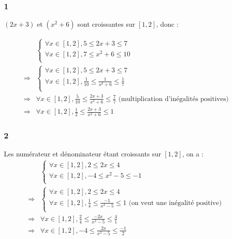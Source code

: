 \documentclass{report}
\begin{document}
\subsubsection*{1}

$(2x+3)$ et $(x^2+6)$ sont croissantes sur $[1, 2]$, donc :

\begin{equation*}
	\begin{split}
	&\begin{cases}
		\forall x \in [1, 2], 5 \le 2x+3 \le 7 \\
		\forall x \in [1, 2], 7 \le x^2+6 \le 10 \\
	\end{cases} \\
	\Rightarrow
	&\begin{cases}
		\forall x \in [1, 2], 5 \le 2x+3 \le 7 \\
		\forall x \in [1, 2], \frac{1}{10} \le \frac{1}{x^2+6} \le \frac{1}{7} \\
	\end{cases}\\
	\Rightarrow
	& \forall x \in [1, 2], \frac{5}{10} \le \frac{2x+3}{x^2+6} \le \frac{7}{7}  \text{ (multiplication d'inégalités positives)}\\
	\Rightarrow
	&\forall x \in [1, 2], \frac{1}{2} \le \frac{2x+3}{x^2+6} \le 1
	\end{split}
\end{equation*}

\subsubsection*{2}

Les numérateur et dénominateur étant croissants sur $[1,2]$, on a :
\begin{equation*}
	\begin{split}
		&\begin{cases}
			\forall x \in [1, 2], 2 \le 2x \le 4 \\
			\forall x \in [1, 2], -4 \le x^2-5 \le -1 \\
		\end{cases} \\
		\Rightarrow
		&\begin{cases}
			\forall x \in [1, 2], 2 \le 2x \le 4 \\
			\forall x \in [1, 2], \frac{1}{4} \le \frac{-1}{x^2-5} \le 1  \text{ (on veut une inégalité positive)}\\
		\end{cases} \\
		\Rightarrow
		& \forall x \in [1, 2], \frac{2}{4} \le \frac{-2x}{x^2-5} \le \frac{4}{1} \\
		\Rightarrow
		& \forall x \in [1, 2], -4 \le \frac{2x}{x^2-5} \le \frac{-1}{2} \\
	\end{split}
\end{equation*}
\end{document}
